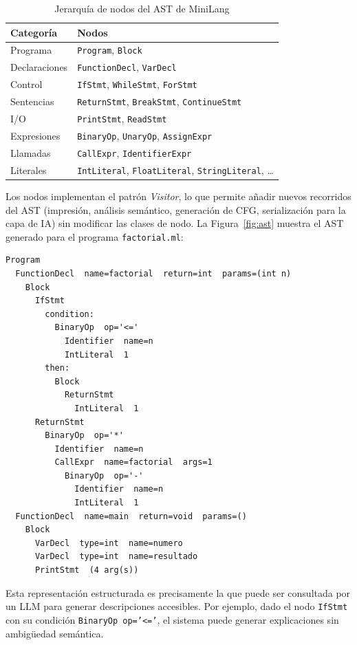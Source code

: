 \documentclass[conference]{IEEEtran}
\begin{document}
\begin{table}[h]
\caption{Jerarquía de nodos del AST de MiniLang}
\label{tab:nodos}
\centering
\begin{tabular}{ll}
\hline
\textbf{Categoría} & \textbf{Nodos} \\
\hline
Programa & \texttt{Program}, \texttt{Block} \\
Declaraciones & \texttt{FunctionDecl}, \texttt{VarDecl} \\
Control & \texttt{IfStmt}, \texttt{WhileStmt}, \texttt{ForStmt} \\
Sentencias & \texttt{ReturnStmt}, \texttt{BreakStmt}, \texttt{ContinueStmt} \\
I/O & \texttt{PrintStmt}, \texttt{ReadStmt} \\
Expresiones & \texttt{BinaryOp}, \texttt{UnaryOp}, \texttt{AssignExpr} \\
Llamadas & \texttt{CallExpr}, \texttt{IdentifierExpr} \\
Literales & \texttt{IntLiteral}, \texttt{FloatLiteral}, \texttt{StringLiteral}, \ldots \\
\hline
\end{tabular}
\end{table}

Los nodos implementan el patrón \textit{Visitor}, lo que permite añadir nuevos recorridos del AST (impresión, análisis semántico, generación de CFG, serialización para la capa de IA) sin modificar las clases de nodo. La Figura~\ref{fig:ast} muestra el AST generado para el programa \texttt{factorial.ml}:

\begin{lstlisting}[language={},numbers=none,caption={AST generado para factorial.ml por el ASTPrinter}]
Program
  FunctionDecl  name=factorial  return=int  params=(int n)
    Block
      IfStmt
        condition:
          BinaryOp  op='<='
            Identifier  name=n
            IntLiteral  1
        then:
          Block
            ReturnStmt
              IntLiteral  1
      ReturnStmt
        BinaryOp  op='*'
          Identifier  name=n
          CallExpr  name=factorial  args=1
            BinaryOp  op='-'
              Identifier  name=n
              IntLiteral  1
  FunctionDecl  name=main  return=void  params=()
    Block
      VarDecl  type=int  name=numero
      VarDecl  type=int  name=resultado
      PrintStmt  (4 arg(s))
\end{lstlisting}

Esta representación estructurada es precisamente la que puede ser consultada por un LLM para generar descripciones accesibles. Por ejemplo, dado el nodo \texttt{IfStmt} con su condición \texttt{BinaryOp op='<='}, el sistema puede generar explicaciones sin ambigüedad semántica.
\end{document}
